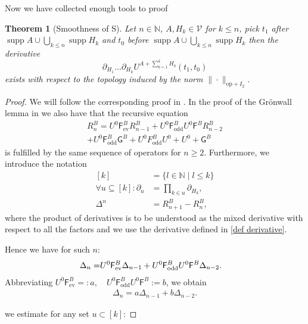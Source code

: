 \documentclass[b5paper,draft,openbib,12pt]{memoir}
\newtheorem{Thm}[Def]{Theorem}
\DeclareMathOperator*{\supp}{supp}
\DeclareMathOperator{\ev}{ev}
\DeclareMathOperator{\odd}{odd}
\begin{document}
Now we have collected enough tools to proof 

\begin{Thm}[Smoothness of S]\label{thm smoothness of S}
Let \(n\in\mathbb{N}\),  \(A,H_{k}\in\mathcal{V}\) for 
\(k\le n\), pick \(t_1\) 
after \(\supp A\cup \bigcup_{k\le n}\supp H_k\) and \(t_0\)
before \(\supp A\cup\bigcup_{k\le n}\supp H_k\) then 
the derivative 
\begin{equation}
  \partial_{H_1}\dots \partial_{H_k}U^{A+\sum_{b=1}^k H_b}(t_1,t_0)
\end{equation}
exists with respect to the topology induced by 
the norm \(\|\cdot\|_{\mathrm{op}+I_2}\).
\end{Thm}
\begin{proof}
We will follow the corresponding proof in \cite{ivp0}.
In the proof of the Grönwall lemma in \cite[equation (3.42)]{ivp0}
we also have that the recursive equation 
\begin{align}
R^B_{n}=U^0\mathsf{F}^B_{\ev}R^B_{n-1}+U^0\mathsf{F}^B_{\odd} U^0\mathsf{F}^B R^B_{n-2}\\
+U^0 \mathsf{F}^B_{\odd}\mathsf{G}^B +U^0F^B_{\odd} U^0 + U^0 +\mathsf{G}^B
\end{align}
is fulfilled by the same sequence of operators for \(n\ge 2\).
Furthermore, we introduce the notation
\begin{align}\label{derivative set 1}
[k]&=\{l\in\mathbb{N}\mid l\le k\}\\\label{derivative set 2}
\forall u\subseteq [k]:\partial_{u}&=\prod_{k\in u}\partial_{H_k},\\
\Delta^n&=R^B_{n+1}-R^B_n,
\end{align}
where the product of derivatives is to be understood as the 
mixed derivative with respect to all the factors and 
we use the derivative defined in 
\eqref{def derivative}.

Hence we have for such \(n\):
\begin{align}\notag
  \Delta_{n}=&U^0\mathsf{F}^B_{\ev}\Delta_{n-1}
  +U^0\mathsf{F}^B_{\odd} U^0\mathsf{F}^B \Delta_{n-2}.
\end{align}
Abbreviating \(U^0\mathsf{F}^B_{\ev}=:a,\quad 
U^0\mathsf{F}^B_{\odd}U^0 \mathsf{F}^B:=b\), we obtain
\begin{align}\label{R recurisve}
  \Delta_{n}=a\Delta_{n-1}
  +b \Delta_{n-2}.
\end{align}

we estimate for any set \(u\subset [k]\):


\end{proof}
\end{document}
